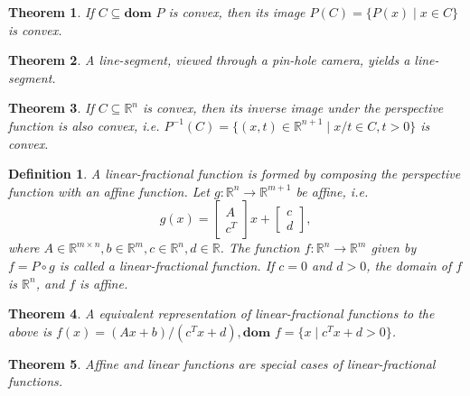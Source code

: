 \documentclass[a4paper]{article}
\newtheorem{mytheorem}{Theorem}
\newtheorem{mydef}{Definition}
\numberwithin{mytheorem}{section}
\numberwithin{mydef}{section}
\numberwithin{example}{section}
\begin{document}
\begin{mytheorem} If $C \subseteq \textbf{dom } P$ is convex, then its image $P(C) = \{ P(x) \mid x \in C \}$ is convex. \end{mytheorem}

\begin{mytheorem} A line-segment, viewed through a pin-hole camera, yields a line-segment. \end{mytheorem}

\begin{mytheorem} If $C \subseteq \mathbb{R}^{n}$ is convex, then its inverse image under the perspective function is also convex, i.e. $P^{-1}(C) = \{ (x,t) \in \mathbb{R}^{n+1} \mid x/t \in C, t > 0 \}$ is convex. \end{mytheorem}

\begin{mydef} A linear-fractional function is formed by composing the perspective function with an affine function. Let $g: \mathbb{R}^{n} \rightarrow \mathbb{R}^{m+1}$ be affine, i.e.  
\[ g(x) = \begin{bmatrix}
A\\
c^{T}
\end{bmatrix} x + \begin{bmatrix}
c\\
d
\end{bmatrix}, \]
where $A \in \mathbb{R}^{m \times n}, b \in \mathbb{R}^{m}, c \in \mathbb{R}^{n}, d \in \mathbb{R}$. The function $f: \mathbb{R}^{n} \rightarrow \mathbb{R}^{m}$ given by $f = P \circ g$ is called a linear-fractional function. If $c = 0$ and $d > 0$, the domain of $f$ is $\mathbb{R}^{n}$, and $f$ is affine. 

\end{mydef}

\begin{mytheorem} A equivalent representation of linear-fractional functions to the above is $f(x) = (Ax + b)/(c^{T}x + d), \textbf{dom } f = \{ x \mid c^{T}x + d > 0 \}$.
\end{mytheorem}

\begin{mytheorem} Affine and linear functions are special cases of linear-fractional functions.
\end{mytheorem}
\end{document}
